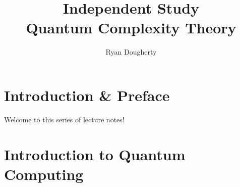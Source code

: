 \documentclass[12pt]{article}
\title{Independent Study \\ Quantum Complexity Theory}
\author{Ryan Dougherty}
\date{}
\theoremstyle{definition}
\numberwithin{theorem}{subsection}
\begin{document}
\maketitle

\tableofcontents

\section{Introduction \& Preface}
Welcome to this series of lecture notes! 

\section{Introduction to Quantum Computing}
\end{document}
